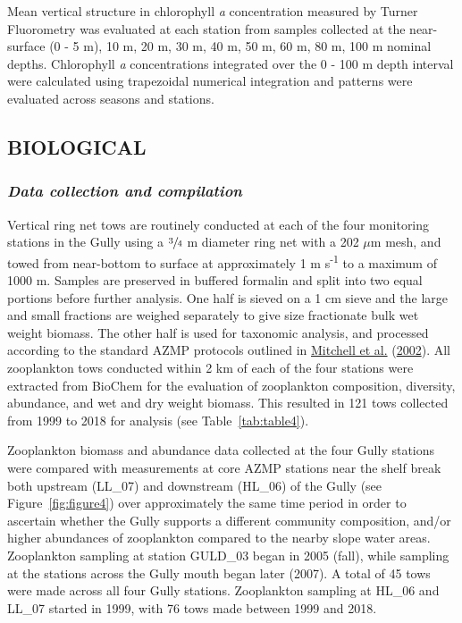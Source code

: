 \documentclass[12pt]{article}\usepackage[]{graphicx}\usepackage[]{color}
\begin{document}
Mean vertical structure in chlorophyll \emph{a} concentration measured by Turner Fluorometry was evaluated at each station from samples collected at the near-surface (0 - 5 m), 10 m, 20 m, 30 m, 40 m, 50 m, 60 m, 80 m, 100 m nominal depths. Chlorophyll \emph{a} concentrations integrated over the 0 - 100 m depth interval were calculated using trapezoidal numerical integration and patterns were evaluated across seasons and stations.

\hypertarget{sec:biological-data}{%
\subsection{\texorpdfstring{\textbf{BIOLOGICAL}}{BIOLOGICAL}}\label{sec:biological-data}}

\hypertarget{data-collection-and-compilation-2}{%
\subsubsection{\texorpdfstring{\emph{Data collection and compilation}}{Data collection and compilation}}\label{data-collection-and-compilation-2}}

Vertical ring net tows are routinely conducted at each of the four monitoring stations in the Gully using a \(\sfrac{3}{4}\) m diameter ring net with a 202 \(\mu\)m mesh, and towed from near-bottom to surface at approximately 1 m s\textsuperscript{-1} to a maximum of 1000 m. Samples are preserved in buffered formalin and split into two equal portions before further analysis. One half is sieved on a 1 cm sieve and the large and small fractions are weighed separately to give size fractionate bulk wet weight biomass. The other half is used for taxonomic analysis, and processed according to the standard AZMP protocols outlined in \protect\hyperlink{ref-mitchell_2002}{Mitchell et al.} (\protect\hyperlink{ref-mitchell_2002}{2002}). All zooplankton tows conducted within 2 km of each of the four stations were extracted from BioChem for the evaluation of zooplankton composition, diversity, abundance, and wet and dry weight biomass. This resulted in 121 tows collected from 1999 to 2018 for analysis (see Table~\ref{tab:table4}).

Zooplankton biomass and abundance data collected at the four Gully stations were compared with measurements at core AZMP stations near the shelf break both upstream (LL\_07) and downstream (HL\_06) of the Gully (see Figure~\ref{fig:figure4}) over approximately the same time period in order to ascertain whether the Gully supports a different community composition, and/or higher abundances of zooplankton compared to the nearby slope water areas. Zooplankton sampling at station GULD\_03 began in 2005 (fall), while sampling at the stations across the Gully mouth began later (2007). A total of 45 tows were made across all four Gully stations. Zooplankton sampling at HL\_06 and LL\_07 started in 1999, with 76 tows made between 1999 and 2018.
\end{document}
